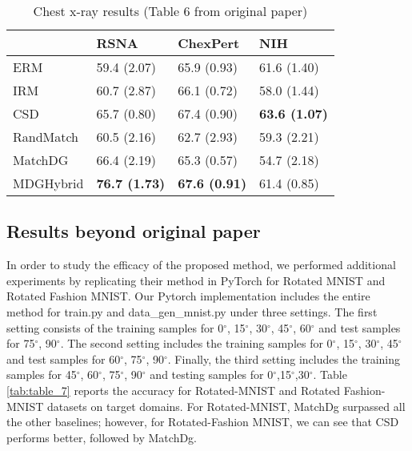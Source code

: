 \begin{table}[h]
\centering
\caption{\label{tab:table_6}Chest x-ray results (Table 6 from original paper)}
\begin{tabular}{l|l|l|l}
\hline
          & RSNA                 & ChexPert             & NIH                  \\ \hline
ERM       & 59.4 (2.07)          & 65.9 (0.93)          & 61.6 (1.40)          \\
IRM       & 60.7 (2.87)          & 66.1 (0.72)          & 58.0 (1.44)          \\
CSD       & 65.7 (0.80)          & 67.4 (0.90)          & \textbf{63.6 (1.07)} \\
RandMatch & 60.5 (2.16)          & 62.7 (2.93)          & 59.3 (2.21)          \\
MatchDG   & 66.4 (2.19)          & 65.3 (0.57)          & 54.7 (2.18)          \\
MDGHybrid & \textbf{76.7 (1.73)} & \textbf{67.6 (0.91)} & 61.4 (0.85)          \\ \hline
\end{tabular}
\end{table}


\subsection{Results beyond original paper}

In order to study the efficacy of the proposed method, we performed additional experiments by replicating their method in PyTorch for Rotated MNIST and Rotated Fashion MNIST. Our Pytorch implementation includes the entire method for train.py and data\_gen\_mnist.py under three settings. The first setting consists of the training samples for 0$^{\circ}$, 15$^{\circ}$, 30$^{\circ}$, 45$^{\circ}$, 60$^{\circ}$ and test samples for 75$^{\circ}$, 90$^{\circ}$. The second setting includes the training samples for 0$^{\circ}$, 15$^{\circ}$, 30$^{\circ}$, 45$^{\circ}$ and test samples for 60$^{\circ}$, 75$^{\circ}$, 90$^{\circ}$. Finally, the third setting includes the training samples for 45$^{\circ}$, 60$^{\circ}$, 75$^{\circ}$, 90$^{\circ}$ and testing samples for 0$^{\circ}$,15$^{\circ}$,30$^{\circ}$. Table \ref{tab:table_7} reports the accuracy for Rotated-MNIST and Rotated Fashion-MNIST datasets on target domains. For Rotated-MNIST, MatchDg surpassed all the other baselines; however, for Rotated-Fashion MNIST, we can see that CSD performs better, followed by MatchDg.

